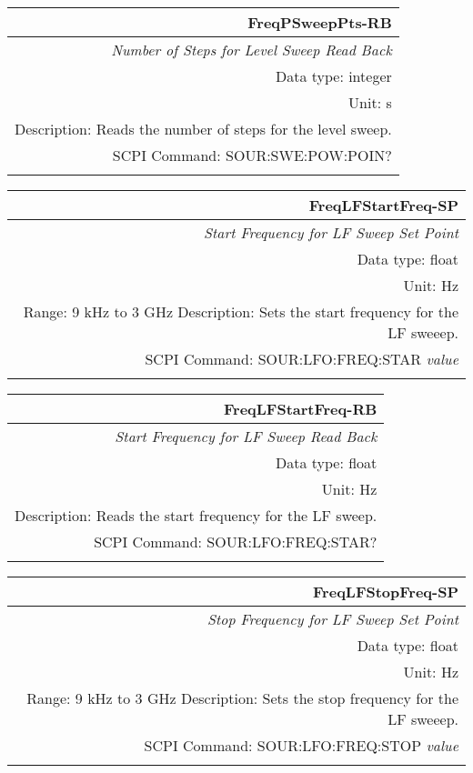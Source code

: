 \documentclass[openany]{article}
\begin{document}
		\begin{tabular}{N}
			\hline
			\bfseries FreqPSweepPts-RB \\ \hline
			\emph{Number of Steps for Level Sweep Read Back} \\
			Data type: integer \\
			Unit: s \\
			Description: Reads the number of steps for the level sweep. \\
			SCPI Command: SOUR:SWE:POW:POIN? \\
			\\

		\end{tabular}



		\begin{tabular}{N}
			\hline
			\bfseries FreqLFStartFreq-SP \\ \hline
			\emph{Start Frequency for LF Sweep Set Point} \\
			Data type: float \\
			Unit: Hz \\ 
			Range: 9 kHz to 3 GHz
			Description: Sets the start frequency for the LF sweeep.\\
			SCPI Command: SOUR:LFO:FREQ:STAR \emph{value} \\
			\\
			
		\end{tabular}


		\begin{tabular}{N}
			\hline
			\bfseries FreqLFStartFreq-RB \\ \hline
			\emph{Start Frequency for LF Sweep Read Back} \\
			Data type: float \\
			Unit: Hz \\
			Description: Reads the start frequency for the LF sweep. \\
			SCPI Command: SOUR:LFO:FREQ:STAR? \\
			\\

		\end{tabular}


		\begin{tabular}{N}
			\hline
			\bfseries FreqLFStopFreq-SP \\ \hline
			\emph{Stop Frequency for LF Sweep Set Point} \\
			Data type: float \\
			Unit: Hz \\ 
			Range: 9 kHz to 3 GHz
			Description: Sets the stop frequency for the LF sweeep.\\
			SCPI Command: SOUR:LFO:FREQ:STOP \emph{value} \\
			\\
			
		\end{tabular}
\end{document}

